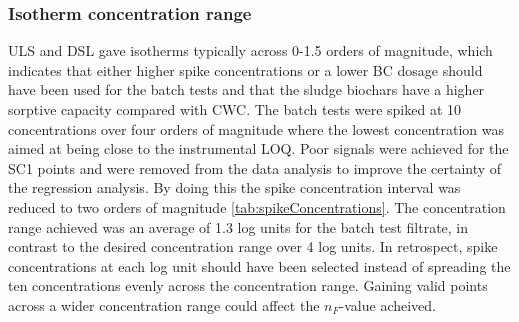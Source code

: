 \subsubsection{Isotherm concentration range}
ULS and DSL gave isotherms typically across 0-1.5 orders of magnitude, which indicates that either higher spike concentrations or a lower BC dosage should have been used for the batch tests and that the sludge biochars have a higher sorptive capacity compared with CWC. The batch tests were spiked at 10 concentrations over four orders of magnitude where the lowest concentration was aimed at being close to the instrumental LOQ. Poor signals were achieved for the SC1 points and were removed from the data analysis to improve the certainty of the regression analysis. By doing this the spike concentration interval was reduced to two orders of magnitude \cref{tab:spikeConcentrations}. The concentration range achieved was an average of 1.3 log units for the batch test filtrate, in contrast to the desired concentration range over 4 log units. In retrospect, spike concentrations at each log unit should have been selected instead of spreading the ten concentrations evenly across the concentration range. Gaining valid points across a wider concentration range could affect the $n_F$-value acheived. 


